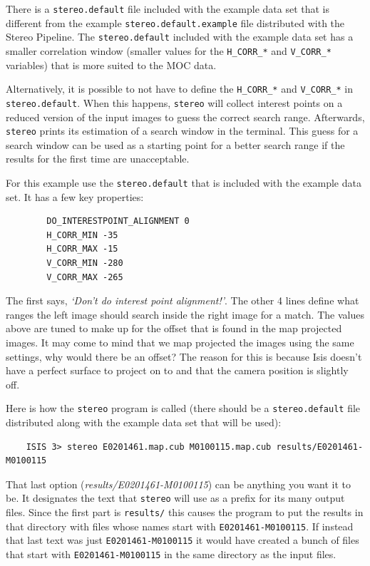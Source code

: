 There is a \texttt{stereo.default} file included with the example
data set that is different from the example \texttt{stereo.default.example}
file distributed with the Stereo Pipeline.  The \texttt{stereo.default}
included with the example data set has a smaller correlation window
(smaller values for the \texttt{H\_CORR\_*} and \texttt{V\_CORR\_*}
variables) that is more suited to the MOC data.

Alternatively, it is possible to not have to define the
\texttt{H\_CORR\_*} and \texttt{V\_CORR\_*} in
\texttt{stereo.default}. When this happens, \texttt{stereo} will
collect interest points on a reduced version of the input images to
guess the correct search range. Afterwards, \texttt{stereo} prints its
estimation of a search window in the terminal. This guess for a search
window can be used as a starting point for a better search range if
the results for the first time are unacceptable.

For this example use the \texttt{stereo.default} that is included with
the example data set. It has a few key properties:

\begin{verbatim}
        DO_INTERESTPOINT_ALIGNMENT 0
        H_CORR_MIN -35
        H_CORR_MAX -15
        V_CORR_MIN -280
        V_CORR_MAX -265
\end{verbatim}
\noindent

The first says, \emph{`Don't do interest point alignment!'}. The other
4 lines define what ranges the left image should search inside the
right image for a match. The values above are tuned to make up for
the offset that is found in the map projected images. It may come to mind
that we map projected the images using the same settings, why would
there be an offset? The reason for this is because Isis doesn't have
a perfect surface to project on to and that the camera position is
slightly off.

Here is how the \texttt{stereo} program is called (there should be a
\texttt{stereo.default} file distributed along with the example data
set that will be used):

\begin{verbatim}
    ISIS 3> stereo E0201461.map.cub M0100115.map.cub results/E0201461-M0100115
\end{verbatim}

\noindent
That last option (\emph{results/E0201461-M0100115}) can be anything you
want it to be.  It designates the text that \texttt{stereo} will use
as a prefix for its many output files.  Since the first part is
\texttt{results/} this causes the program to put the results in that
directory with files whose names start with
\texttt{E0201461-M0100115}. If instead that last text was just
\texttt{E0201461-M0100115} it would have created a bunch of files that
start with \texttt{E0201461-M0100115} in the same directory as the
input files.

